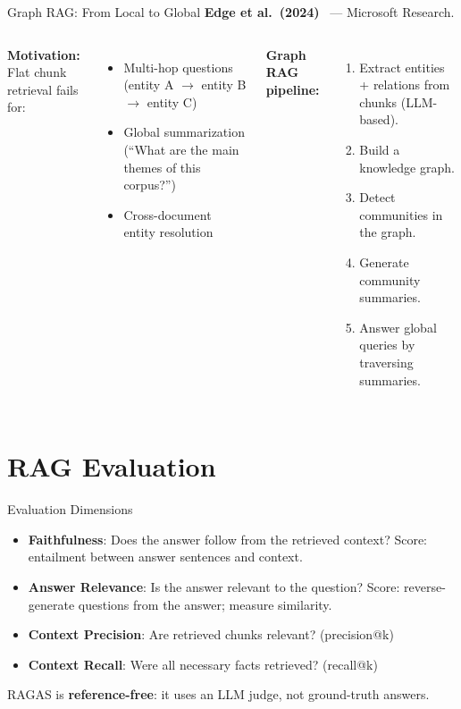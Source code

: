 \documentclass[aspectratio=169,10pt]{beamer}
\begin{document}
\begin{frame}{Graph RAG: From Local to Global}
  \textbf{Edge et al.\ (2024)}~\cite{edge2024graphrag} — Microsoft Research.
  \vspace{0.4em}
  \begin{columns}[T]
      \textbf{Motivation:} Flat chunk retrieval fails for:
      \begin{itemize}
        \item Multi-hop questions (entity A $\to$ entity B $\to$ entity C)
        \item Global summarization (``What are the main themes of this corpus?'')
        \item Cross-document entity resolution
      \end{itemize}
      \vspace{0.4em}
      \textbf{Graph RAG pipeline:}
      \begin{enumerate}
        \item Extract entities + relations from chunks (LLM-based).
        \item Build a knowledge graph.
        \item Detect communities in the graph.
        \item Generate community summaries.
        \item Answer global queries by traversing summaries.
      \end{enumerate}
  \end{columns}
\end{frame}

\section{RAG Evaluation}

\begin{frame}{Evaluation Dimensions}
  \begin{tcolorbox}[hitbox, title=RAGAS Framework~\cite{es2023ragas}]
    \begin{itemize}
      \item \textbf{Faithfulness}: Does the answer follow from the retrieved context?
            Score: entailment between answer sentences and context.
      \item \textbf{Answer Relevance}: Is the answer relevant to the question?
            Score: reverse-generate questions from the answer; measure similarity.
      \item \textbf{Context Precision}: Are retrieved chunks relevant? (precision@k)
      \item \textbf{Context Recall}: Were all necessary facts retrieved? (recall@k)
    \end{itemize}
  \end{tcolorbox}
  \vspace{0.3em}
  RAGAS is \textbf{reference-free}: it uses an LLM judge, not ground-truth answers.
\end{frame}
\end{document}
